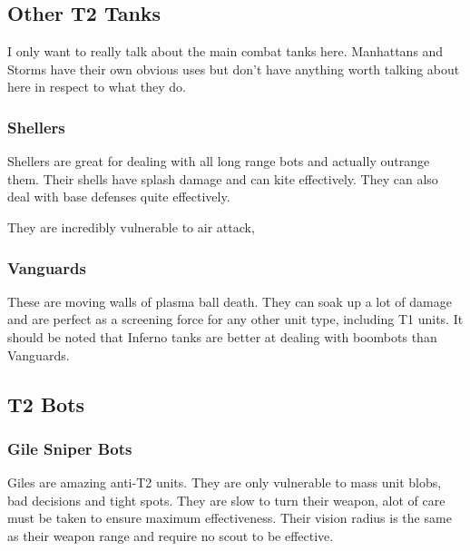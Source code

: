 \documentclass[]{article}
\begin{document}
\subsection{Other T2 Tanks}

I only want to really talk about the main combat tanks here.  Manhattans and Storms have their own obvious uses but don't have anything worth talking about here in respect to what they do.  
\subsubsection{Shellers}

Shellers are great for dealing with all long range bots and actually outrange them.  Their shells have splash damage and can kite effectively.  They can also deal with base defenses quite effectively.  

They are incredibly vulnerable to air attack,  

\subsubsection{Vanguards}

These are moving walls of plasma ball death.  They can soak up a lot of damage and are perfect as a screening force for any other unit type, including T1 units.  It should be noted that Inferno tanks are better at dealing with boombots than Vanguards.  
 
\subsection{T2 Bots}




\subsubsection{Gile Sniper Bots}

Giles are amazing anti-T2 units.  They are only vulnerable to mass unit blobs, bad decisions and tight spots.  They are slow to turn their weapon, alot of care must be taken to ensure maximum effectiveness.  Their vision radius is the same as their weapon range and require no scout to be effective. 
\end{document}
